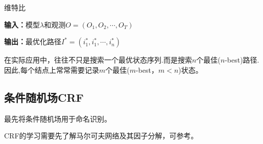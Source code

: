 \documentclass[a4paper,UTF8,no-math]{ctexart}
\begin{document}
	\begin{algorithm}
		\caption{维特比}
		\label{alg:viterbi}
		{\bf 输入：}模型$\lambda$和观测$O = (O_{1},O_{2}, \cdots ,O_{T})$
		
		{\bf 输出：}最优化路径$I^{*} = (i^{*}_{1},i^{*}_{1},\cdots,i^{*}_{n})$
		
		\begin{algorithmic}[1] 
		\end{algorithmic} 
	
	\end{algorithm}
	
	在实际应用中，往往不只是搜索一个最优状态序列.而是搜索$n$个最佳($n$-best)路径.因此,每个结点上常常需要记录$m$个最佳($m$-best，$m<n$)状态。
	
	
	
	\newpage
%	
%	
%	
	

	\subsection{条件随机场CRF}
	
	\citep{lafferty2001conditional}最先将条件随机场用于命名识别。
	
	CRF的学习需要先了解马尔可夫网络及其因子分解，可参考\citep{李航2012统计学习方法}。
	
\end{document}
